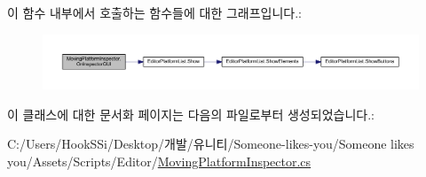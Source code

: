이 함수 내부에서 호출하는 함수들에 대한 그래프입니다.\+:\nopagebreak
\begin{figure}[H]
\begin{center}
\leavevmode
\includegraphics[width=350pt]{d4/d7d/class_moving_platform_inspector_aa060686c6b8aa6e2d3d854b1fb5b26d3_cgraph}
\end{center}
\end{figure}


이 클래스에 대한 문서화 페이지는 다음의 파일로부터 생성되었습니다.\+:\begin{DoxyCompactItemize}
\item 
C\+:/\+Users/\+Hook\+S\+Si/\+Desktop/개발/유니티/\+Someone-\/likes-\/you/\+Someone likes you/\+Assets/\+Scripts/\+Editor/\mbox{\hyperlink{_moving_platform_inspector_8cs}{Moving\+Platform\+Inspector.\+cs}}\end{DoxyCompactItemize}
